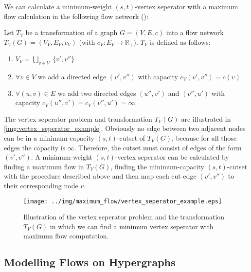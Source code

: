 We can calculate a minimum-weight $(s,t)$-vertex seperator with a maximum flow
calculation in the following flow network ():

\begin{definition}
\label{def:vertex_seperator_transformation}
Let $T_V$ be a transformation of a graph $G = (V,E,c)$ into 
a flow network $T_V(G) = (V_V, E_V, c_V)$ (with $c_V: E_V \rightarrow \mathbb{R}_+$). 
$T_V$ is defined as follows:
\begin{enumerate}
\item $V_V = \bigcup\limits_{v \in V}\ \{v', v''\}$
\item $\forall v \in V$ we add a directed edge $(v',v'')$
      with capacity $c_V(v',v'') = c(v)$
\item $\forall (u,v) \in E$ we add two directed edges $(u'', v')$ and 
      $(v'', u')$ with capacity $c_V(u'', v') = c_V(v'', u') = \infty$.
\end{enumerate} 
\end{definition}

The vertex seperator problem and transformation $T_V(G)$ are illustrated in \autoref{img:vertex_seperator_example}.
Obviously no edge between two adjacent nodes can be in a minimum-capacity $(s,t)$-cutset of $T_V(G)$,
because for all those edges the capacity is $\infty$. Therefore, the cutset must consist
of edges of the form $(v',v'')$. A minimum-weight $(s,t)$-vertex seperator can be calculated by
finding a maximum flow in $T_V(G)$, finding the minimum-capacity $(s,t)$-cutset with the procedure
described above and then map each cut edge $(v',v'')$ to their corresponding node $v$.


\begin{figure}
\centering
\texttt{[image: ../img/maximum\_flow/vertex\_seperator\_example.eps]}
\caption{ Illustration of the vertex seperator problem and the transformation $T_V(G)$ in which
          we can find a minimum vertex seperator with maximum flow computation. }
\label{img:vertex_seperator_example}
\end{figure}


\subsection{Modelling Flows on Hypergraphs}
\label{sec:related_model_flow}

